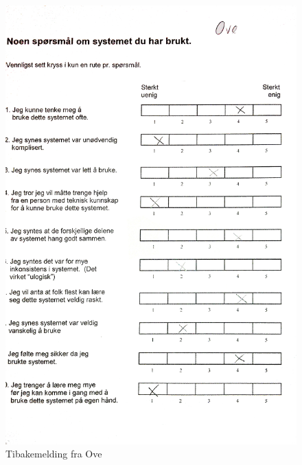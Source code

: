 \begin{figure}[ove]
\centering
\includegraphics[width=140mm]{images/tilbakemelding_ove.jpg}
\caption{Tibakemelding fra Ove}
\label{overflow}
\end{figure}
